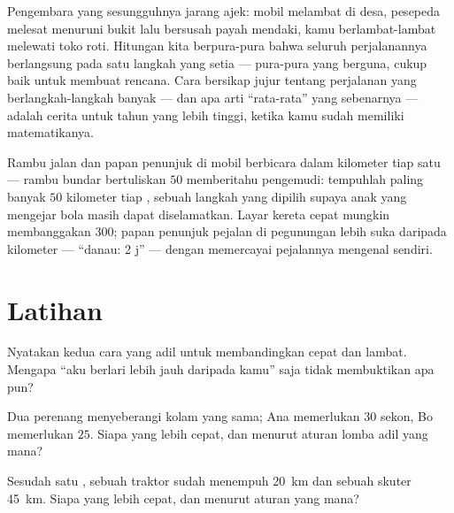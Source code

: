 \begin{remark}\label{rem:g5:speed-distance-time:steady}
Pengembara yang sesungguhnya jarang ajek: mobil melambat di desa,
pesepeda melesat menuruni bukit lalu bersusah payah mendaki, kamu
berlambat-lambat melewati toko roti. Hitungan kita berpura-pura bahwa
seluruh perjalanannya berlangsung pada satu langkah yang setia ---
pura-pura yang berguna, cukup baik untuk membuat rencana. Cara
bersikap jujur tentang perjalanan yang berlangkah-langkah banyak ---
dan apa arti ``rata-rata'' yang sebenarnya --- adalah cerita untuk
tahun yang lebih tinggi, ketika kamu sudah memiliki matematikanya.
\end{remark}

\begin{example}\label{ex:g5:speed-distance-time:signs}
Rambu jalan dan papan penunjuk di mobil berbicara dalam kilometer tiap
satu  --- rambu bundar bertuliskan $50$ memberitahu pengemudi:
tempuhlah paling banyak $50$ kilometer tiap , sebuah langkah yang
dipilih supaya anak yang mengejar bola masih dapat diselamatkan. Layar
kereta cepat mungkin membanggakan $300$; papan penunjuk pejalan di
pegunungan lebih suka  daripada kilometer --- ``danau: 2 j'' ---
dengan memercayai pejalannya mengenal  sendiri.
\end{example}

\section{Latihan}

\begin{exercise}[$\star$]\label{exo:g5:speed-distance-time:1}
Nyatakan kedua cara yang adil untuk membandingkan cepat dan lambat.
Mengapa ``aku berlari lebih jauh daripada kamu'' saja tidak
membuktikan apa pun?
\end{exercise}

\begin{exercise}[$\star$]\label{exo:g5:speed-distance-time:2}
Dua perenang menyeberangi kolam yang sama; Ana memerlukan $30$ sekon,
Bo memerlukan $25$. Siapa yang lebih cepat, dan menurut aturan lomba
adil yang mana?
\end{exercise}

\begin{exercise}[$\star$]\label{exo:g5:speed-distance-time:3}
Sesudah satu , sebuah traktor sudah menempuh \qty{20}{km} dan
sebuah skuter \qty{45}{km}. Siapa yang lebih cepat, dan menurut aturan
yang mana?
\end{exercise}

